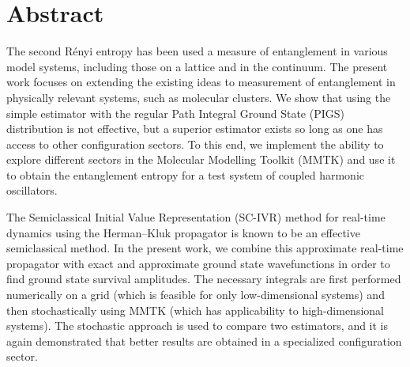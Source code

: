 \chapter*{Abstract}

The second Rényi entropy has been used a measure of entanglement in various model systems, including those on a lattice and in the continuum.
The present work focuses on extending the existing ideas to measurement of entanglement in physically relevant systems, such as molecular clusters.
We show that using the simple estimator with the regular Path Integral Ground State (PIGS) distribution is not effective, but a superior estimator exists so long as one has access to other configuration sectors.
To this end, we implement the ability to explore different sectors in the Molecular Modelling Toolkit (MMTK) and use it to obtain the entanglement entropy for a test system of coupled harmonic oscillators.

The Semiclassical Initial Value Representation (SC-IVR) method for real-time dynamics using the Herman--Kluk propagator is known to be an effective semiclassical method.
In the present work, we combine this approximate real-time propagator with exact and approximate ground state wavefunctions in order to find ground state survival amplitudes.
The necessary integrals are first performed numerically on a grid (which is feasible for only low-dimensional systems) and then stochastically using MMTK (which has applicability to high-dimensional systems).
The stochastic approach is used to compare two estimators, and it is again demonstrated that better results are obtained in a specialized configuration sector.
